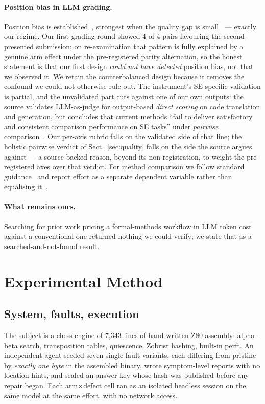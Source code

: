 \documentclass[runningheads]{llncs}
\begin{document}
\paragraph{Position bias in LLM grading.} Position bias is
established~\cite{zheng2023,wang2024}, strongest when the quality gap is
small~\cite{shi2025} --- exactly our regime. Our first grading round showed 4
of 4 pairs favouring the second-presented submission; on re-examination that
pattern is fully explained by a genuine arm effect under the pre-registered
parity alternation, so the honest statement is that our first design
\emph{could not have detected} position bias, not that we observed it. We
retain the counterbalanced design because it removes the confound we could
not otherwise rule out. The instrument's SE-specific validation is partial,
and the unvalidated part cuts against one of our own outputs: the source
validates LLM-as-judge for output-based \emph{direct scoring} on code
translation and generation, but concludes that current methods ``fail to
deliver satisfactory and consistent comparison performance on SE tasks''
under \emph{pairwise} comparison~\cite{wangj2025}. Our per-axis rubric
falls on the validated side of that line; the holistic pairwise verdict of
Sect.~\ref{sec:quality} falls on the side the source argues against --- a
source-backed reason, beyond its non-registration, to weight the
pre-registered axes over that verdict. For method comparison we follow standard
guidance~\cite{ko2015} and report effort as a separate dependent variable
rather than equalising it~\cite{hannay2009}.

\paragraph{What remains ours.} Searching for prior work pricing a
formal-methods workflow in LLM token cost against a conventional one returned
nothing we could verify; we state that as a searched-and-not-found result.

\section{Experimental Method}

\subsection{System, faults, execution}
The subject is a chess engine of 7{,}343 lines of hand-written Z80 assembly:
alpha--beta search, transposition tables, quiescence, Zobrist hashing,
built-in perft. An independent agent seeded seven single-fault variants, each
differing from pristine by \emph{exactly one byte} in the assembled binary,
wrote symptom-level reports with no location hints, and sealed an answer key
whose hash was published before any repair began. Each arm$\times$defect cell
ran as an isolated headless session on the same model at the same effort,
with no network access.
\end{document}
